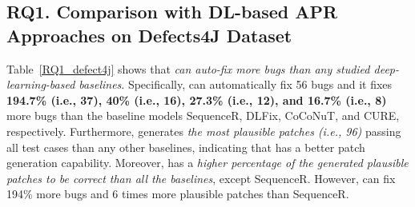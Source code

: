 \subsection{\bf RQ1. Comparison with DL-based APR Approaches on Defects4J Dataset}

Table~\ref{RQ1_defect4j} shows that {\em {\tool} can auto-fix more bugs
than any studied deep-learning-based baselines}. Specifically, {\tool}
can automatically fix 56 bugs and it fixes {\bf 194.7\% (i.e., 37), 40\%
(i.e., 16), 27.3\% (i.e., 12), and 16.7\% (i.e., 8)} more bugs than the
baseline models SequenceR, DLFix, CoCoNuT, and CURE,
respectively. Furthermore, {\tool} generates {\em the most plausible
patches (i.e., 96)} passing all test cases than any other baselines,
indicating that {\tool} has a better patch generation
capability. Moreover, {\tool} has a {\em higher percentage of the generated
plausible patches to be correct than all the baselines}, except
SequenceR. However, {\tool} can fix 194\% more bugs and 6 times more
plausible patches than SequenceR.







